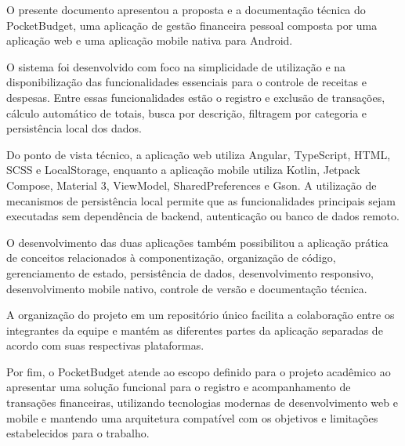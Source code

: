 \documentclass[12pt,a4paper]{article}
\begin{document}
O presente documento apresentou a proposta e a documentação técnica do PocketBudget, uma aplicação de gestão financeira pessoal composta por uma aplicação web e uma aplicação mobile nativa para Android.

O sistema foi desenvolvido com foco na simplicidade de utilização e na disponibilização das funcionalidades essenciais para o controle de receitas e despesas. Entre essas funcionalidades estão o registro e exclusão de transações, cálculo automático de totais, busca por descrição, filtragem por categoria e persistência local dos dados.

Do ponto de vista técnico, a aplicação web utiliza Angular, TypeScript, HTML, SCSS e LocalStorage, enquanto a aplicação mobile utiliza Kotlin, Jetpack Compose, Material 3, ViewModel, SharedPreferences e Gson. A utilização de mecanismos de persistência local permite que as funcionalidades principais sejam executadas sem dependência de backend, autenticação ou banco de dados remoto.

O desenvolvimento das duas aplicações também possibilitou a aplicação prática de conceitos relacionados à componentização, organização de código, gerenciamento de estado, persistência de dados, desenvolvimento responsivo, desenvolvimento mobile nativo, controle de versão e documentação técnica.

A organização do projeto em um repositório único facilita a colaboração entre os integrantes da equipe e mantém as diferentes partes da aplicação separadas de acordo com suas respectivas plataformas.

Por fim, o PocketBudget atende ao escopo definido para o projeto acadêmico ao apresentar uma solução funcional para o registro e acompanhamento de transações financeiras, utilizando tecnologias modernas de desenvolvimento web e mobile e mantendo uma arquitetura compatível com os objetivos e limitações estabelecidos para o trabalho.
\end{document}
